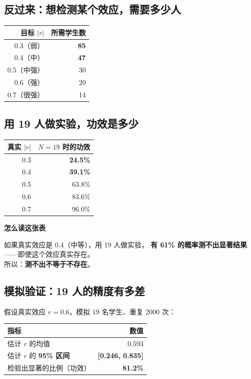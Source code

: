 \documentclass[UTF8,a4paper,11pt]{ctexart}
\newenvironment{explainbox}[1]
{\begin{center}\begin{minipage}{0.94\textwidth}\colorbox{boxbg}{\parbox{0.92\textwidth}{\textbf{#1}\par\vspace{2pt}}}}
{\end{minipage}\end{center}}
\begin{document}
\subsection{反过来：想检测某个效应，需要多少人}

\begin{center}
\begin{tabular}{rr}
\toprule
\textbf{目标 $\lvert r\rvert$} & \textbf{所需学生数} \\
\midrule
0.3（弱） & \textbf{85} \\
0.4（中） & \textbf{47} \\
0.5（中强） & 30 \\
0.6（强） & 20 \\
0.7（很强） & 14 \\
\bottomrule
\end{tabular}
\end{center}

\subsection{用 19 人做实验，功效是多少}

\begin{center}
\begin{tabular}{rr}
\toprule
\textbf{真实 $\lvert r\rvert$} & \textbf{$N=19$ 时的功效} \\
\midrule
0.3 & \textbf{24.5\%} \\
0.4 & \textbf{39.1\%} \\
0.5 & 63.8\% \\
0.6 & 83.6\% \\
0.7 & 96.0\% \\
\bottomrule
\end{tabular}
\end{center}

\begin{explainbox}{怎么读这张表}
如果真实效应是 0.4（中等），用 19 人做实验，
\textbf{有 61\% 的概率测不出显著结果}——即使这个效应真实存在。\\[4pt]
所以：\textbf{测不出不等于不存在}。
\end{explainbox}

\subsection{模拟验证：19 人的精度有多差}

假设真实效应 $r=0.6$，模拟 19 名学生、重复 2000 次：

\begin{center}
\begin{tabular}{lr}
\toprule
\textbf{指标} & \textbf{数值} \\
\midrule
估计 $r$ 的均值 & 0.593 \\
估计 $r$ 的 \textbf{95\% 区间} & \textbf{[0.246, 0.835]} \\
检验出显著的比例（功效） & \textbf{81.2\%} \\
\bottomrule
\end{tabular}
\end{center}
\end{document}
